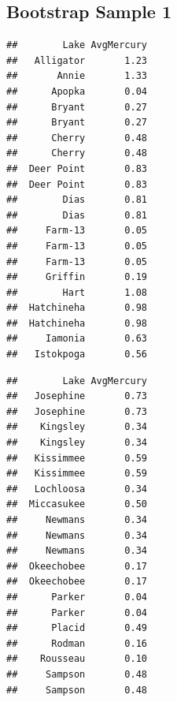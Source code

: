 \documentclass[]{book}
\newenvironment{Shaded}{\begin{snugshade}}{\end{snugshade}}
\newcommand{\KeywordTok}[1]{\textcolor[rgb]{0.13,0.29,0.53}{\textbf{#1}}}
\newcommand{\DataTypeTok}[1]{\textcolor[rgb]{0.13,0.29,0.53}{#1}}
\newcommand{\DecValTok}[1]{\textcolor[rgb]{0.00,0.00,0.81}{#1}}
\newcommand{\StringTok}[1]{\textcolor[rgb]{0.31,0.60,0.02}{#1}}
\newcommand{\OtherTok}[1]{\textcolor[rgb]{0.56,0.35,0.01}{#1}}
\newcommand{\OperatorTok}[1]{\textcolor[rgb]{0.81,0.36,0.00}{\textbf{#1}}}
\newcommand{\NormalTok}[1]{#1}
\begin{document}
\begin{Shaded}
\end{Shaded}

\begin{Shaded}
\end{Shaded}

\subsection{Bootstrap Sample 1}\label{bootstrap-sample-1}

\begin{verbatim}
##        Lake AvgMercury
##   Alligator       1.23
##       Annie       1.33
##      Apopka       0.04
##      Bryant       0.27
##      Bryant       0.27
##      Cherry       0.48
##      Cherry       0.48
##  Deer Point       0.83
##  Deer Point       0.83
##        Dias       0.81
##        Dias       0.81
##     Farm-13       0.05
##     Farm-13       0.05
##     Farm-13       0.05
##     Griffin       0.19
##        Hart       1.08
##  Hatchineha       0.98
##  Hatchineha       0.98
##     Iamonia       0.63
##   Istokpoga       0.56
\end{verbatim}

\begin{verbatim}
##        Lake AvgMercury
##   Josephine       0.73
##   Josephine       0.73
##    Kingsley       0.34
##    Kingsley       0.34
##   Kissimmee       0.59
##   Kissimmee       0.59
##   Lochloosa       0.34
##  Miccasukee       0.50
##     Newmans       0.34
##     Newmans       0.34
##     Newmans       0.34
##  Okeechobee       0.17
##  Okeechobee       0.17
##      Parker       0.04
##      Parker       0.04
##      Placid       0.49
##      Rodman       0.16
##    Rousseau       0.10
##     Sampson       0.48
##     Sampson       0.48
\end{verbatim}
\end{document}
